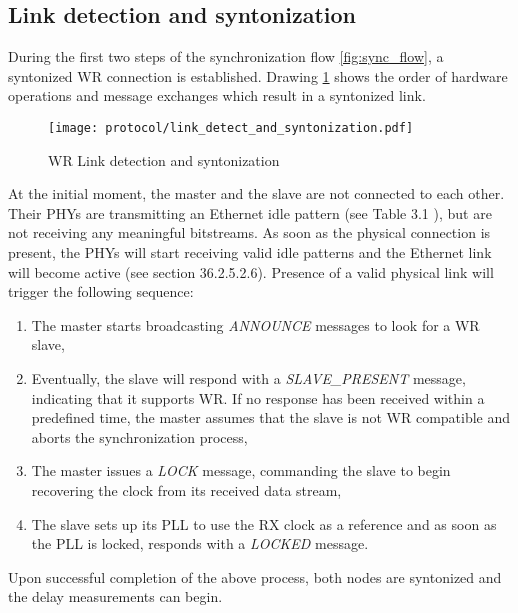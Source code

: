 \subsection{Link detection and syntonization}
During the first two steps of the synchronization flow
\ref{fig:sync_flow}, a syntonized WR connection is established. Drawing
\ref{fig:link_detect_and_syntonization} shows the order of hardware operations
and message exchanges which result in a syntonized link.
\begin{figure}[ht!]
  \centering
  \texttt{[image: protocol/link\_detect\_and\_syntonization.pdf]}
  \caption{WR Link detection and syntonization}
  \label{fig:link_detect_and_syntonization}
\end{figure}
At the initial moment, the master and the slave are not connected to
each other. Their PHYs are transmitting an Ethernet idle pattern (see Table 3.1 \cite{tomekMSC}), 
but are not receiving any meaningful bitstreams. As soon
as the physical connection is present, the PHYs will start receiving valid
idle patterns and the Ethernet link will become active (see \cite{IEEE802.3}
section 36.2.5.2.6). Presence of a valid physical link will trigger the
following sequence:
\begin{enumerate}
\item The master starts broadcasting \textit{ANNOUNCE} messages to look for
a WR slave,
\item Eventually, the slave will respond with a \textit{SLAVE\_PRESENT}
message, indicating that it supports WR. If no response has been received
within a predefined time, the master assumes that the slave is not WR
compatible and aborts the synchronization process,
\item The master issues a \textit{LOCK} message, commanding the slave to
begin recovering the clock from its received data stream,
\item The slave sets up its PLL to use the RX clock as a reference and as
soon as the PLL is locked, responds with a \textit{LOCKED} message.
\end{enumerate}
Upon successful completion of the above process, both nodes are syntonized
and the delay measurements can begin.

